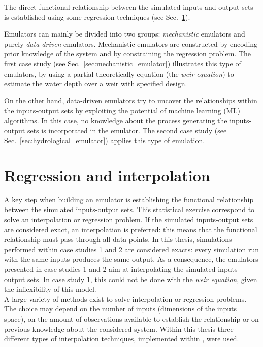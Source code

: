 The direct functional relationship between the simulated inputs and output sets is established using some regression techniques (see Sec.~\ref{sec:regression_interpolation}).

Emulators can mainly be divided into two groups: \emph{mechanistic} emulators and purely \emph{data-driven} emulators.
Mechanistic emulators are constructed by encoding prior knowledge of the system and by constraining the regression problem. The first case study (see Sec.~\ref{sec:mechanistic_emulator}) illustrates this type of emulators, by using a partial theoretically equation (the \textit{weir equation}) to estimate the water depth over a weir with specified design.

On the other hand, data-driven emulators try to uncover the relationships within the inputs-output sets by exploiting the potential of machine learning (ML) algorithms. In this case, no knowledge about the process generating the inputs-output sets is incorporated in the emulator. The second case study (see Sec.~\ref{sec:hydrological_emulator}) applies this type of emulation. 


\section{Regression and interpolation}\label{sec:regression_interpolation}

A key step when building an emulator is establishing the functional relationship between the simulated inputs-output sets. This statistical exercise correspond to solve an interpolation or regression problem.
If the simulated inputs-output sets are considered exact, an interpolation is preferred: this means that the functional relationship must pass through all data points. In this thesis, simulations performed within case studies 1 and 2 are considered exacts: every simulation run with the same inputs produces the same output.
As a consequence, the emulators presented in case studies 1 and 2 aim at interpolating the simulated inputs-output sets.
In case study 1, this could not be done with the \textit{weir equation}, given the inflexibility of this model.\\

A large variety of methods exist to solve interpolation or regression problems. The choice may depend on the number of inputs (dimensions of the inputs space), on the amount of observations available to establish the relationship or on previous knowledge about the considered system.
Within this thesis three different types of interpolation techniques, implemented within , were used.

